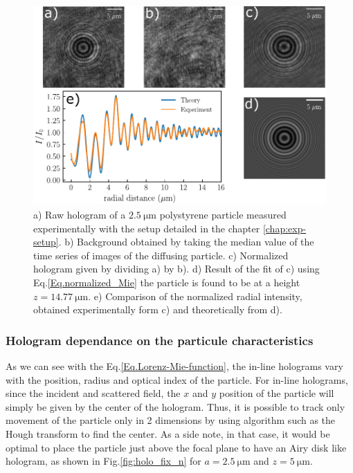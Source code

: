 \begin{figure}[H]
	\centering
	\includegraphics[scale=1]{02_body/chapter2/images/lorenz_mie_fit_demo/plot_lorenz_mie.pdf}
	\caption{a) Raw hologram of a $2.5 ~ \mathrm{\mu m}$ polystyrene particle measured experimentally with the setup detailed in the chapter \ref{chap:exp-setup}. b) Background obtained by taking the median value of the time series of images of the diffusing particle. c) Normalized hologram given by dividing a) by b). d) Result of the fit of c) using Eq.{\ref{Eq.normalized_Mie}} the particle is found to be at a height $z = 14.77 ~ \mathrm{\mu m}$. e) Comparison of the normalized radial intensity, obtained experimentally form c) and theoretically from d).}
	\label{fig.Lorenz_mie_demo}
\end{figure}

\subsubsection{Hologram dependance on the particule characteristics}



As we can see with the Eq.\ref{Eq.Lorenz-Mie-function}, the in-line holograms vary with the position, radius and optical index of the particle. For in-line holograms, since the incident and scattered field, the $x$ and $y$ position of the particle will simply be given by the center of the hologram. Thus, it is possible to track only movement of the particle only in 2 dimensions by using algorithm such as the Hough transform to find the center. As a side note, in that case, it would be optimal to place the particle just above the focal plane to have an Airy disk like hologram, as shown in Fig.\ref{fig:holo_fix_n} for $a = 2.5 ~ \mathrm{\mu m}$ and $z = 5 ~\mathrm{\mu m}$.

